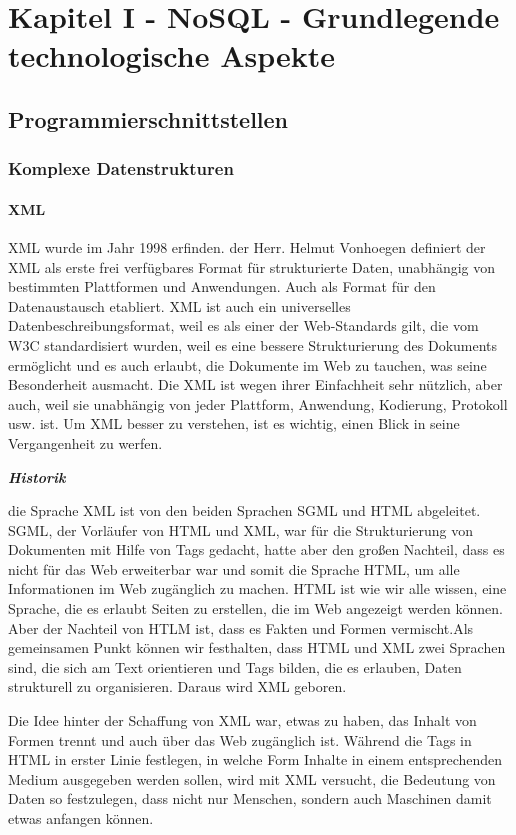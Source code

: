 \chapter{Kapitel I - NoSQL - Grundlegende technologische Aspekte}
\setcounter{section}{7}
\section{Programmierschnittstellen}

\subsection{Komplexe Datenstrukturen}
\subsubsection{XML}
\ac{XML} wurde im Jahr 1998 erfinden. der Herr. Helmut Vonhoegen definiert der XML als erste frei verfügbares Format für strukturierte Daten, unabhängig von bestimmten Plattformen und Anwendungen. Auch als Format für den Datenaustausch etabliert. XML ist auch ein universelles Datenbeschreibungsformat, weil es als einer der Web-Standards gilt, die vom \ac{W3C} standardisiert wurden, weil es eine bessere Strukturierung des Dokuments ermöglicht und es auch erlaubt, die Dokumente im Web zu tauchen, was seine Besonderheit ausmacht. Die XML ist wegen ihrer Einfachheit sehr nützlich, aber auch, weil sie unabhängig von jeder Plattform, Anwendung, Kodierung, Protokoll usw. ist. Um XML besser zu verstehen, ist es wichtig, einen Blick in seine Vergangenheit zu werfen.

\textit{\textbf{Historik}}

die Sprache XML ist von den beiden Sprachen \ac{SGML} und \ac{HTML} abgeleitet. \ac{SGML}, der Vorläufer von HTML und XML, war für die Strukturierung von Dokumenten mit Hilfe von Tags gedacht, hatte aber den großen Nachteil, dass es nicht für das Web erweiterbar war und somit die Sprache HTML, um alle Informationen im Web zugänglich zu machen.  HTML ist wie wir alle wissen, eine Sprache, die es erlaubt Seiten zu erstellen, die im Web angezeigt werden können. Aber der Nachteil von HTLM ist, dass es Fakten und Formen vermischt.Als gemeinsamen Punkt können wir festhalten, dass HTML und XML zwei Sprachen sind, die sich am Text orientieren und Tags bilden, die es erlauben, Daten strukturell zu organisieren. Daraus wird XML geboren. 

Die Idee hinter der Schaffung von XML war, etwas zu haben, das Inhalt von Formen trennt und auch über das Web zugänglich ist. Während die Tags in HTML in erster Linie festlegen, in welche Form Inhalte in einem entsprechenden Medium ausgegeben werden sollen, wird mit XML versucht, die Bedeutung von Daten so festzulegen, dass nicht nur Menschen, sondern auch Maschinen damit etwas anfangen können.\cite{helmut32}


